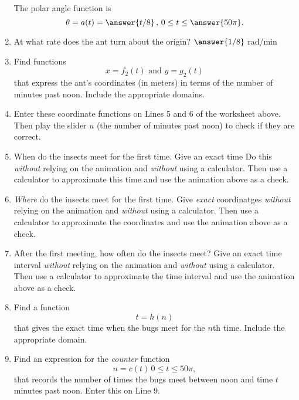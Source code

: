 \documentclass{ximera}
\begin{document}
\begin{example}
\begin{enumerate}
The polar angle function is
\[
   \theta = a(t) = \answer{t/8} \, , \, 0 \leq t \leq \answer{50\pi} .
\]

\item At what rate does the ant turn about the origin?  $\answer{1/8}$ rad/min



\item Find functions
\[
   x = f_2(t) \text{ and } y=g_2(t)
\]
that express the ant's coordinates (in meters)  in terms of the number of minutes past noon. Include the appropriate domains.


\item Enter these coordinate functions on Lines 5 and 6 of the worksheet above. Then play the slider $u$ (the number of minutes past noon) to check if they are correct.

\item When do the insects meet for the first time. Give an exact time Do this \emph{without} relying on the animation and \emph{without} using a calculator. Then use a calculator to approximate this time and use the animation above as a check.

\item \emph{Where} do the insects meet for the first time. Give \emph{exact} coordinatges \emph{without} relying on the animation and \emph{without} using a calculator. Then use a calculator to approximate the coordinates and use the animation above as a check.

\item After the first meeting, how often do the insects meet? Give an exact time interval \emph{without} relying on the animation and \emph{without} using a calculator. Then use a calculator to approximate the time interval and use the animation above as a check.

\item Find a function 
\[
    t = h(n)
\]
that gives the exact time when the bugs meet for the $n$th time. Include the appropriate domain.

\item Find an expression for the \emph{counter} function 
\[
      n = c(t) \, 0\leq t \leq 50\pi , 
\]
that records the number of times the bugs meet between noon and time $t$ minutes past noon. Enter this on Line 9.

\end{enumerate}
\end{example}
\end{document}
